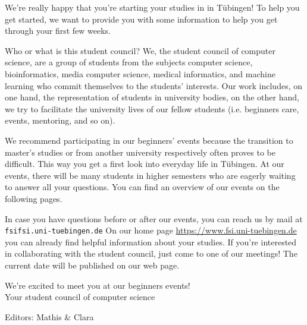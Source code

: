 \thispagestyle{firststyle}
We're really happy that you're starting your studies in \studiengang in Tübingen!
To help you get started, we want to provide you with some information to help you get through your first few weeks.

Who or what is this \glqq student council\grqq? We, the student council of computer science, are a group of students from the subjects computer science, bioinformatics, media computer science, medical informatics, and machine learning
who commit themselves to the students' interests. Our work includes, on one hand, the representation of students in university bodies, on the other hand, we try to facilitate the university lives of our fellow students (i.e. beginners care,
events, mentoring, and so on).

\ifmaster
    \ifml
We recommend participating in our beginners' events because the transition to master's studies or from another university respectively often proves to be difficult. This way you get a first look into everyday life in Tübingen.
    \fi
\fi
At our events, there will be many students in higher semesters who are eagerly waiting to answer all your questions. You can find an overview of our events on the following pages.

In case you have questions before or after our events, you can reach us by mail at \texttt{fsi\At fsi.uni-tuebingen.de}
On our home page
\url{https://www.fsi.uni-tuebingen.de} you can already find helpful information about your studies. If you're interested in collaborating with the student council, just come to one of our meetings! The current date will be published on our web page.

We're excited to meet you at our beginners events!\\
Your student council of computer science
\enlargethispage{3\baselineskip} %
\par\hfill{\footnotesize Editors: Mathis \& Clara}
\vfill

